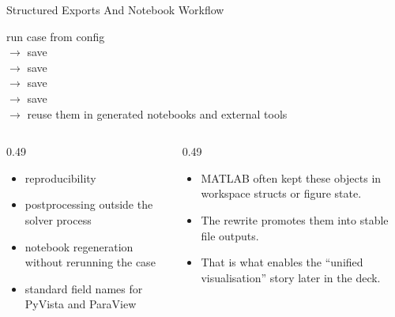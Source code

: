 \documentclass[aspectratio=169,10pt]{beamer}
\begin{document}
\begin{frame}{Structured Exports And Notebook Workflow}
\small
\begin{pseudobox}
run case from config\\
$\rightarrow$ save \\
$\rightarrow$ save \\
$\rightarrow$ save \\
$\rightarrow$ save \\
$\rightarrow$ reuse them in generated notebooks and external tools
\end{pseudobox}
\vspace{0.16cm}
\begin{columns}[T,totalwidth=\textwidth]
\begin{column}{0.49\textwidth}
\begin{softbox}
\begin{itemize}
  \item reproducibility
  \item postprocessing outside the solver process
  \item notebook regeneration without rerunning the case
  \item standard field names for PyVista and ParaView
\end{itemize}
\end{softbox}
\end{column}
\begin{column}{0.49\textwidth}
\begin{softbox}
\begin{itemize}
  \item MATLAB often kept these objects in workspace structs or figure state.
  \item The rewrite promotes them into stable file outputs.
  \item That is what enables the ``unified visualisation'' story later in the deck.
\end{itemize}
\end{softbox}
\end{column}
\end{columns}
\end{frame}
\end{document}
